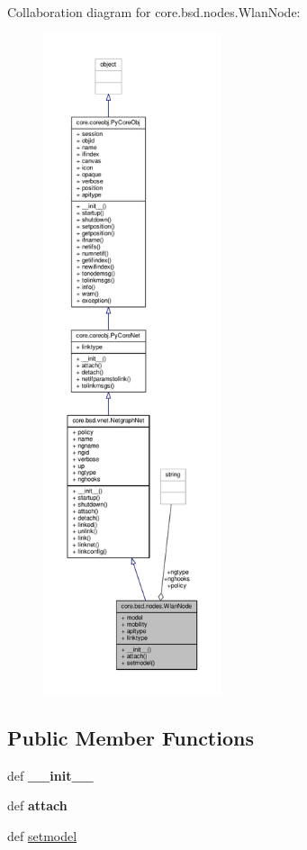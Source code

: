 Collaboration diagram for core.\+bsd.\+nodes.\+Wlan\+Node\+:
\nopagebreak
\begin{figure}[H]
\begin{center}
\leavevmode
\includegraphics[height=550pt]{classcore_1_1bsd_1_1nodes_1_1_wlan_node__coll__graph}
\end{center}
\end{figure}
\subsection*{Public Member Functions}
\begin{DoxyCompactItemize}
\item 
\hypertarget{classcore_1_1bsd_1_1nodes_1_1_wlan_node_a9ebbfae137f17446a1f7ad651e284bc1}{def {\bfseries \+\_\+\+\_\+init\+\_\+\+\_\+}}\label{classcore_1_1bsd_1_1nodes_1_1_wlan_node_a9ebbfae137f17446a1f7ad651e284bc1}

\item 
\hypertarget{classcore_1_1bsd_1_1nodes_1_1_wlan_node_a377211f92c416502cb9ffe9a298d21f7}{def {\bfseries attach}}\label{classcore_1_1bsd_1_1nodes_1_1_wlan_node_a377211f92c416502cb9ffe9a298d21f7}

\item 
def \hyperlink{classcore_1_1bsd_1_1nodes_1_1_wlan_node_a81060b1b059726e1931eebf9a257763b}{setmodel}
\end{DoxyCompactItemize}
